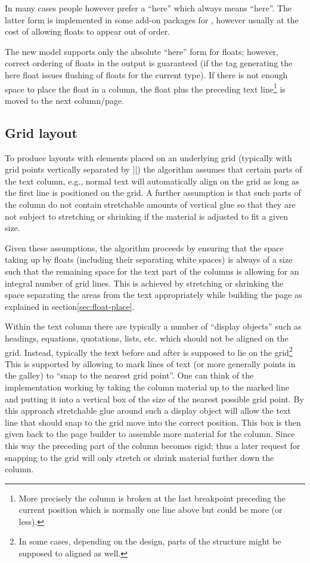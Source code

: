 \documentclass[twocolumn]{article}
\begin{document}
In many cases people however prefer a ``here'' which always means
``here''. The latter form is implemented in some add-on packages for
\LaTeXe{}, however usually at the cost of allowing floats to appear out
of order.

The new model supports only the absolute ``here'' form for floats;
however, correct ordering of floats in the output is guaranteed (if
the tag generating the here float issues flushing of floats for the
current type). If
there is not enough space to place the float in a column, the float
plus the preceding text line\footnote{More precisely the column is
broken at the last breakpoint preceding the current position which is
normally one line above but could be more (or less).} is moved to the
next column/\allowbreak page.


\subsection{Grid layout}

To produce layouts with elements placed on an underlying grid
(typically with grid points vertically separated by |\baselineskip|)
the algorithm assumes that certain parts of the text column, e.g.,
normal text will automatically align on the grid as long as the first
line is positioned on the grid. A further assumption is that such
parts of the column do not contain stretchable amounts of vertical
glue so that they are not subject to stretching or shrinking if the
material is adjusted to fit a given size.

Given these assumptions, the algorithm proceeds by ensuring that the
space taking up by floats (including their separating white spaces) is
always of a size such that the remaining space for the text part of the
columns is allowing for an integral number of grid lines. This is
achieved by stretching or shrinking the space separating the areas
from the text appropriately while building the page as explained in
section\vref{sec:float-place}.

Within the text column there are typically a number of ``display
objects'' such as headings, equations, quotations, lists, etc\@. which
should not be aligned on the grid. Instead, typically the text before
and after is supposed to lie on the grid\footnote{In some cases,
depending on the design, parts of the structure might be supposed to
aligned as well.} This is supported by allowing to mark lines of text
(or more generally points in the galley) to ``snap to the nearest grid
point''. One can think of the implementation working by taking the
column material up to the marked line and putting it into a vertical
box of the size of the nearest possible grid point. By this approach
stretchable glue around such a display object will allow the text line
that should snap to the grid move into the correct position. This box
is then given back to the page builder to assemble more material for
the column. Since this way the preceding part of the column becomes
rigid; thus a later request for snapping to the grid will only stretch
or shrink material further down the column.
\end{document}
